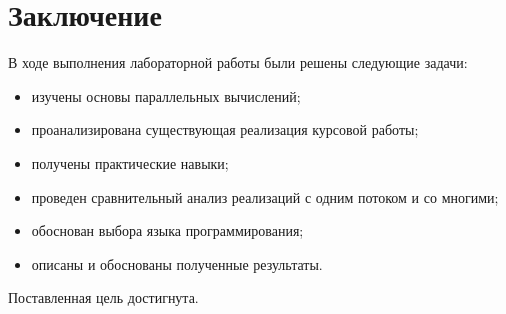 \chapter*{Заключение}

В ходе выполнения лабораторной работы были решены следующие задачи:

\begin{itemize}
	\item изучены основы параллельных вычислений;
	\item проанализирована существующая реализация курсовой работы;
	\item получены практические навыки;
	\item проведен сравнительный анализ реализаций с одним потоком и со многими;
	\item обоснован выбора языка программирования;
	\item описаны и обоснованы полученные результаты.
\end{itemize}

Поставленная цель достигнута.

